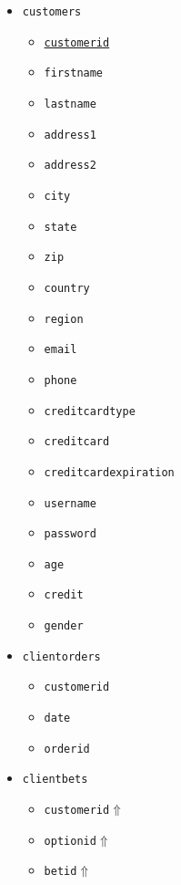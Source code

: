 \documentclass{article}
\begin{document}
\begin{multicols}{2}
\begin{itemize}
    \item\texttt{customers}
        \begin{itemize}
            \item\texttt{\underline{customerid}}
            \item\texttt{firstname}
            \item\texttt{lastname}
            \item\texttt{address1}
            \item\texttt{address2}
            \item\texttt{city}
            \item\texttt{state}
            \item\texttt{zip}
            \item\texttt{country}
            \item\texttt{region}
            \item\texttt{email}
            \item\texttt{phone}
            \item\texttt{creditcardtype}
            \item\texttt{creditcard}
            \item\texttt{creditcardexpiration}
            \item\texttt{username}
            \item\texttt{password}
            \item\texttt{age}
            \item\texttt{credit}
            \item\texttt{gender}
        \end{itemize}
    \item\texttt{clientorders}
        \begin{itemize}
            \item\texttt{customerid}
            \item\texttt{date}
            \item\texttt{orderid}
        \end{itemize}
    \columnbreak
    \item\texttt{clientbets}
        \begin{itemize}
            \item\texttt{customerid$\Uparrow$}
            \item\texttt{optionid}$\Uparrow$
            \item\texttt{betid}$\Uparrow$

\end{itemize}
\end{itemize}
\end{multicols}
\end{document}
